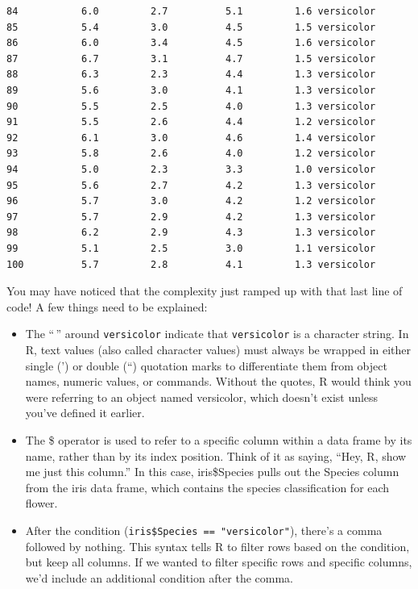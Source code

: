 \documentclass[
  letterpaper,
]{book}
\begin{document}
\begin{verbatim}
84           6.0         2.7          5.1         1.6 versicolor
85           5.4         3.0          4.5         1.5 versicolor
86           6.0         3.4          4.5         1.6 versicolor
87           6.7         3.1          4.7         1.5 versicolor
88           6.3         2.3          4.4         1.3 versicolor
89           5.6         3.0          4.1         1.3 versicolor
90           5.5         2.5          4.0         1.3 versicolor
91           5.5         2.6          4.4         1.2 versicolor
92           6.1         3.0          4.6         1.4 versicolor
93           5.8         2.6          4.0         1.2 versicolor
94           5.0         2.3          3.3         1.0 versicolor
95           5.6         2.7          4.2         1.3 versicolor
96           5.7         3.0          4.2         1.2 versicolor
97           5.7         2.9          4.2         1.3 versicolor
98           6.2         2.9          4.3         1.3 versicolor
99           5.1         2.5          3.0         1.1 versicolor
100          5.7         2.8          4.1         1.3 versicolor
\end{verbatim}

You may have noticed that the complexity just ramped up with that last
line of code! A few things need to be explained:

\begin{itemize}
\item
  The ``\,'' around \texttt{versicolor} indicate that
  \texttt{versicolor} is a character string. In R, text values (also
  called character values) must always be wrapped in either single (')
  or double (``) quotation marks to differentiate them from object
  names, numeric values, or commands. Without the quotes, R would think
  you were referring to an object named versicolor, which doesn't exist
  unless you've defined it earlier.
\item
  The \$ operator is used to refer to a specific column within a data
  frame by its name, rather than by its index position. Think of it as
  saying, ``Hey, R, show me just this column.'' In this case,
  iris\$Species pulls out the Species column from the iris data frame,
  which contains the species classification for each flower.
\item
  After the condition (\texttt{iris\$Species\ ==\ "versicolor"}),
  there's a comma followed by nothing. This syntax tells R to filter
  rows based on the condition, but keep all columns. If we wanted to
  filter specific rows and specific columns, we'd include an additional
  condition after the comma.
\end{itemize}
\end{document}
